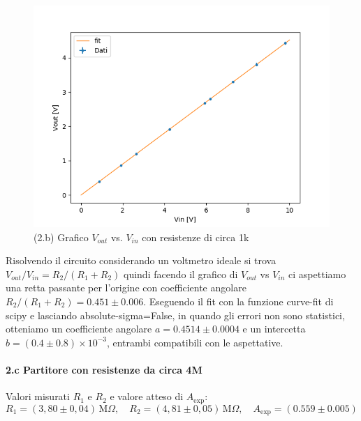 \documentclass[10pt,a4paper]{article}
\begin{document}
\begin{figure}[h]
\centering
\includegraphics[scale=0.6]{plot_2b.png}
 

\caption{(2.b) Grafico $V_{out}$ vs. $V_{in}$ con resistenze di circa 1k \label{f:par1}}
\end{figure}

Risolvendo il circuito considerando un voltmetro ideale si trova $V_{out}/V_{in} = R_2/(R_1+R_2)$ quindi facendo il grafico di $V_{out}$ vs $V_{in}$ ci aspettiamo una retta passante per l'origine con coefficiente angolare $R_2/(R_1+R_2) = 0.451 \pm 0.006$. Eseguendo il fit con la funzione curve-fit di scipy e lasciando absolute-sigma=False, in quando gli errori non sono statistici, otteniamo un coefficiente angolare $a=0.4514\pm0.0004$ e un intercetta $b=(0.4\pm0.8)\times10^{-3}$, entrambi compatibili con le aspettative. 


\paragraph{2.c Partitore con resistenze da circa 4M}
Valori misurati $R_1$ e $R_2$ e valore atteso di $A_\mathrm{exp}$:
\[
R_1 = ( 3,80 \pm 0,04 ) \,\mathrm{M}\Omega, \quad
R_2 = ( 4,81 \pm 0,05 ) \,\mathrm{M}\Omega, \quad
A_\mathrm{exp} = ( 0.559 \pm 0.005 ) 
\]
\end{document}

